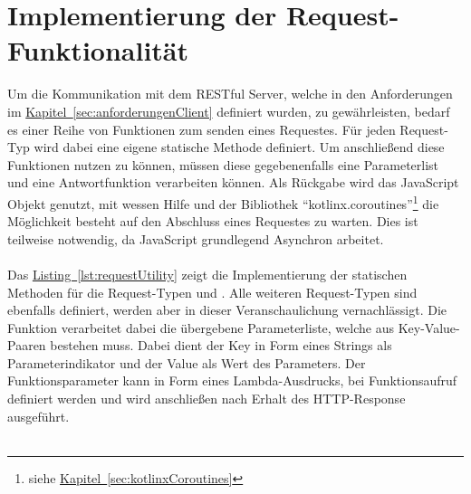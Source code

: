 \section{Implementierung der Request-Funktionalität}\label{sec:requestFunctionality}
Um die Kommunikation mit dem \gls{REST}ful Server, welche in den Anforderungen im \hyperref[sec:anforderungenClient]{Kapitel~\ref{sec:anforderungenClient}} definiert wurden, zu gewährleisten, bedarf es einer Reihe von Funktionen zum senden eines Requestes. Für jeden Request-Typ wird dabei eine eigene statische Methode definiert. Um anschließend diese Funktionen nutzen zu können, müssen diese gegebenenfalls eine Parameterlist und eine Antwortfunktion verarbeiten können. Als Rückgabe wird das JavaScript  Objekt genutzt, mit wessen Hilfe und der Bibliothek \enquote{kotlinx.coroutines}\footnote{siehe \hyperref[sec:kotlinxCoroutines]{Kapitel~\ref{sec:kotlinxCoroutines}}} die Möglichkeit besteht auf den Abschluss eines Requestes zu warten. Dies ist teilweise notwendig, da JavaScript grundlegend Asynchron arbeitet.\\
\\
Das \hyperref[lst:requestUtility]{Listing~\ref{lst:requestUtility}} zeigt die Implementierung der statischen Methoden für die Request-Typen  und . Alle weiteren Request-Typen sind ebenfalls definiert, werden aber in dieser Veranschaulichung vernachlässigt. Die Funktion  verarbeitet dabei die übergebene Parameterliste, welche aus Key-Value-Paaren bestehen muss. Dabei dient der Key in Form eines Strings als Parameterindikator und der Value als Wert des Parameters. Der Funktionsparameter  kann in Form eines Lambda-Ausdrucks, bei Funktionsaufruf definiert werden und wird anschließen nach Erhalt des \gls{HTTP}-Response ausgeführt.\\
\\
